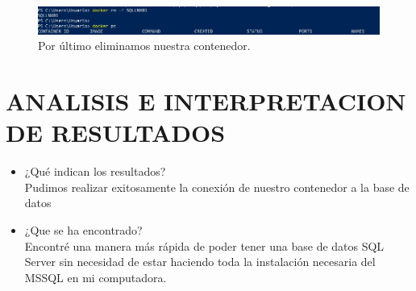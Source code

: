 \documentclass[preprint,12pt]{elsarticle}
\begin{document}
\begin{figure}[H]
	\begin{center}
		\includegraphics[width=12cm]{./IMAGENES/foto17} 
		\caption{Por último eliminamos nuestra contenedor.}
	\end{center}
\end{figure}

\section{ANALISIS E INTERPRETACION DE RESULTADOS }
\begin{itemize}
	\item ¿Qué indican los resultados? \\
	Pudimos realizar exitosamente la conexión de nuestro contenedor a la base de datos
	\item ¿Que se ha encontrado?\\
	Encontré una manera más rápida de poder tener una base de datos SQL Server sin necesidad de estar haciendo toda la instalación necesaria del MSSQL en mi computadora.
\end{itemize}
\end{document}
